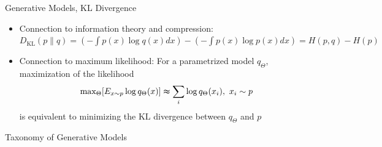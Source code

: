 \begin{frame}{Generative Models, KL Divergence}
\protect\hypertarget{generative-models-kl-divergence}{}

\begin{itemize}
\tightlist
\item
  Connection to information theory and compression:\\
  \(D_{\text{KL}} (p \parallel q) = (-\int p(x)\log q(x)dx) - (-\int p(x)\log p(x)dx) = H(p, q) - H(p)\)
\item
  Connection to maximum likelihood: For a parametrized model
  \(q_{\Theta}\), maximization of the likelihood
  \[ \text{max}_{\Theta}[E_{x \sim p} \log q_{\Theta}(x)] \thickapprox \sum_i \log q_{\Theta}(x_i),\ x_i \sim p \]
  is equivalent to minimizing the \(\text{KL}\) divergence between
  \(q_{\Theta}\) and \(p\)
\end{itemize}

\end{frame}

\begin{frame}{Taxonomy of Generative Models}
\protect\hypertarget{taxonomy-of-generative-models}{}


\end{frame}

